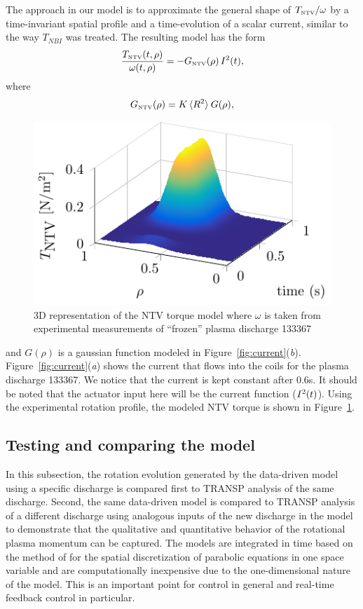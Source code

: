 \documentclass[12pt]{iopart}
\begin{document}
The approach in our model is to approximate the general shape of $T_\textrm{\tiny{NTV}}/\omega$ by a time-invariant spatial profile and a time-evolution of a scalar current, similar to the way $T_{NBI}$ was treated. The resulting model has the form  
\begin{equation}
   \frac{T_\textrm{\tiny{NTV}}(t,\rho)}{\omega(t,\rho)} = - G_\textrm{\tiny NTV}  (\rho) \, I^2(t),
\end{equation}
where
\begin{equation}
G_\textrm{\tiny NTV}  (\rho) = K \,  \langle R^2 \rangle \:G(\rho),
\end{equation}

\begin{figure}
\centering
\includegraphics{imene_figs/fig8} %
\caption{3D representation  of the NTV torque model where $\omega$ is taken from experimental measurements of ``frozen'' plasma discharge 133367}
\label{TNTV3D}
\end{figure}

and $G(\rho)$ is a gaussian function modeled in Figure~{\ref{fig:current}}(\emph{b}). Figure~{\ref{fig:current}}(\emph{a}) shows the current that flows into the coils for the plasma discharge  133367. We notice that the current is kept constant after $0.6$s. It should be noted that the actuator input here will be the current function (${I^2}\textrm(t)$). 
Using the experimental rotation profile, the modeled NTV torque is shown in Figure~\ref{TNTV3D}.

\subsection{Testing and comparing the model}

In this subsection, the rotation evolution generated by the data-driven model using a specific discharge is compared first to TRANSP analysis of the same discharge. Second, the same data-driven model is compared to TRANSP analysis of a different discharge using analogous inputs of the new discharge in the model to demonstrate that the qualitative and quantitative behavior of the rotational plasma momentum can be captured.  The models are integrated in time based on the method of \cite{Skeel90} for  the spatial discretization of parabolic equations in one space variable and are computationally inexpensive due to the one-dimensional nature of the model.  This is an important point for control in general and real-time feedback control in particular. 
\end{document}
